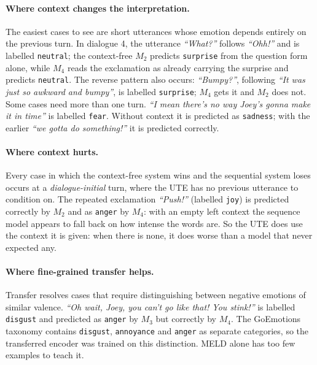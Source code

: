 \documentclass[sigconf,nonacm]{acmart}
\begin{document}
\paragraph{Where context changes the interpretation.}
The easiest cases to see are short utterances whose emotion depends entirely on the
previous turn. In dialogue 4, the utterance \emph{``What?''} follows \emph{``Ohh!''} and is labelled
\texttt{neutral}; the context-free $M_2$ predicts \texttt{surprise} from the question form
alone, while $M_4$ reads the exclamation as already carrying the surprise and predicts
\texttt{neutral}. The reverse pattern also occurs: \emph{``Bumpy?''}, following
\emph{``It was just so awkward and bumpy''}, is labelled \texttt{surprise}; $M_4$ gets it
and $M_2$ does not. Some cases need more than one turn. \emph{``I mean there's no way
Joey's gonna make it in time''} is labelled \texttt{fear}. Without context it is predicted
as \texttt{sadness}; with the earlier \emph{``we gotta do something!''} it is predicted
correctly.

\paragraph{Where context hurts.}
Every case in which the context-free system wins and the sequential system loses occurs at a
\emph{dialogue-initial} turn, where the UTE has no previous utterance to condition on. The
repeated exclamation \emph{``Push!''} (labelled \texttt{joy}) is predicted correctly by
$M_2$ and as \texttt{anger} by $M_4$: with an empty left context the sequence model appears
to fall back on how intense the words are. So the UTE does use the context it is given:
when there is none, it does worse than a model that never expected any.

\paragraph{Where fine-grained transfer helps.}
Transfer resolves cases that require distinguishing between negative emotions of similar
valence. \emph{``Oh wait, Joey, you can't go like that! You stink!''} is labelled
\texttt{disgust} and predicted as \texttt{anger} by $M_3$ but correctly by $M_4$. The
GoEmotions taxonomy contains \texttt{disgust}, \texttt{annoyance} and \texttt{anger} as
separate categories, so the transferred encoder was trained on this distinction. MELD
alone has too few examples to teach it.
\end{document}
